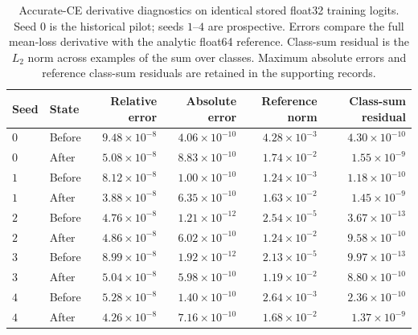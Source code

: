 \begin{table}[htbp]
\centering\small
\setlength{\tabcolsep}{4pt}
\caption{Accurate-CE derivative diagnostics on identical stored float32 training logits. Seed $0$ is the historical pilot; seeds $1$--$4$ are prospective. Errors compare the full mean-loss derivative with the analytic float64 reference. Class-sum residual is the $L_2$ norm across examples of the sum over classes. Maximum absolute errors and reference class-sum residuals are retained in the supporting records.}
\label{tab:rms-derivatives}
\begin{tabular}{llrrrr}
\toprule
Seed & State & Relative error & Absolute error & Reference norm & Class-sum residual \\
\midrule
$0$ & Before & $9.48\times10^{-8}$ & $4.06\times10^{-10}$ & $4.28\times10^{-3}$ & $4.30\times10^{-10}$ \\
$0$ & After & $5.08\times10^{-8}$ & $8.83\times10^{-10}$ & $1.74\times10^{-2}$ & $1.55\times10^{-9}$ \\
$1$ & Before & $8.12\times10^{-8}$ & $1.00\times10^{-10}$ & $1.24\times10^{-3}$ & $1.18\times10^{-10}$ \\
$1$ & After & $3.88\times10^{-8}$ & $6.35\times10^{-10}$ & $1.63\times10^{-2}$ & $1.45\times10^{-9}$ \\
$2$ & Before & $4.76\times10^{-8}$ & $1.21\times10^{-12}$ & $2.54\times10^{-5}$ & $3.67\times10^{-13}$ \\
$2$ & After & $4.86\times10^{-8}$ & $6.02\times10^{-10}$ & $1.24\times10^{-2}$ & $9.58\times10^{-10}$ \\
$3$ & Before & $8.99\times10^{-8}$ & $1.92\times10^{-12}$ & $2.13\times10^{-5}$ & $9.97\times10^{-13}$ \\
$3$ & After & $5.04\times10^{-8}$ & $5.98\times10^{-10}$ & $1.19\times10^{-2}$ & $8.80\times10^{-10}$ \\
$4$ & Before & $5.28\times10^{-8}$ & $1.40\times10^{-10}$ & $2.64\times10^{-3}$ & $2.36\times10^{-10}$ \\
$4$ & After & $4.26\times10^{-8}$ & $7.16\times10^{-10}$ & $1.68\times10^{-2}$ & $1.37\times10^{-9}$ \\
\bottomrule
\end{tabular}
\end{table}
